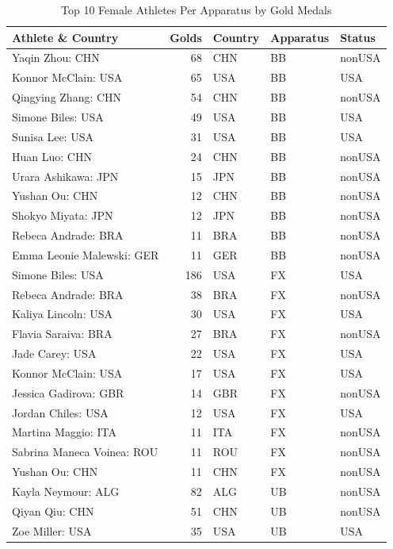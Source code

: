 \documentclass[
  10.5pt,
  letterpaper,
  DIV=11,
  numbers=noendperiod]{scrartcl}
\begin{document}
\begin{table}[H]

\caption{Top 10 Female Athletes Per Apparatus by Gold Medals}
\centering
\fontsize{8}{10}\selectfont
\begin{tabular}[t]{l|r|l|l|l}
\hline
Athlete \& Country & Golds & Country & Apparatus & Status\\
\hline
Yaqin Zhou: CHN & 68 & CHN & BB & nonUSA\\
\hline
Konnor McClain: USA & 65 & USA & BB & USA\\
\hline
Qingying Zhang: CHN & 54 & CHN & BB & nonUSA\\
\hline
Simone Biles: USA & 49 & USA & BB & USA\\
\hline
Sunisa Lee: USA & 31 & USA & BB & USA\\
\hline
Huan Luo: CHN & 24 & CHN & BB & nonUSA\\
\hline
Urara Ashikawa: JPN & 15 & JPN & BB & nonUSA\\
\hline
Yushan Ou: CHN & 12 & CHN & BB & nonUSA\\
\hline
Shokyo Miyata: JPN & 12 & JPN & BB & nonUSA\\
\hline
Rebeca Andrade: BRA & 11 & BRA & BB & nonUSA\\
\hline
Emma Leonie Malewski: GER & 11 & GER & BB & nonUSA\\
\hline
Simone Biles: USA & 186 & USA & FX & USA\\
\hline
Rebeca Andrade: BRA & 38 & BRA & FX & nonUSA\\
\hline
Kaliya Lincoln: USA & 30 & USA & FX & USA\\
\hline
Flavia Saraiva: BRA & 27 & BRA & FX & nonUSA\\
\hline
Jade Carey: USA & 22 & USA & FX & USA\\
\hline
Konnor McClain: USA & 17 & USA & FX & USA\\
\hline
Jessica Gadirova: GBR & 14 & GBR & FX & nonUSA\\
\hline
Jordan Chiles: USA & 12 & USA & FX & USA\\
\hline
Martina Maggio: ITA & 11 & ITA & FX & nonUSA\\
\hline
Sabrina Maneca Voinea: ROU & 11 & ROU & FX & nonUSA\\
\hline
Yushan Ou: CHN & 11 & CHN & FX & nonUSA\\
\hline
Kayla Neymour: ALG & 82 & ALG & UB & nonUSA\\
\hline
Qiyan Qiu: CHN & 51 & CHN & UB & nonUSA\\
\hline
Zoe Miller: USA & 35 & USA & UB & USA\\

\end{tabular}
\end{table}
\end{document}

